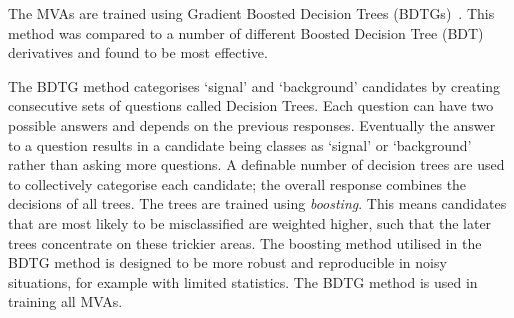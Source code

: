 The MVAs are trained using Gradient Boosted Decision Trees (BDTGs)~\cite{Breiman}. This method was compared to a number of different Boosted Decision Tree (BDT) derivatives and found to be most effective.

The BDTG method categorises `signal' and `background' candidates by creating consecutive sets of questions called Decision Trees. Each question can have two possible answers and depends on the previous responses. Eventually the answer to a question results in a candidate being classes as `signal' or `background' rather than asking more questions. A definable number of decision trees are used to collectively categorise each candidate; the overall response combines the decisions of all trees. The trees are trained using \emph{boosting}. This means candidates that are most likely to be misclassified are weighted higher, such that the later trees concentrate on these trickier areas.  
The boosting method utilised in the BDTG method is designed to be more robust and reproducible in noisy situations, for example with limited statistics. 
The BDTG method is used in training all MVAs.


% 

